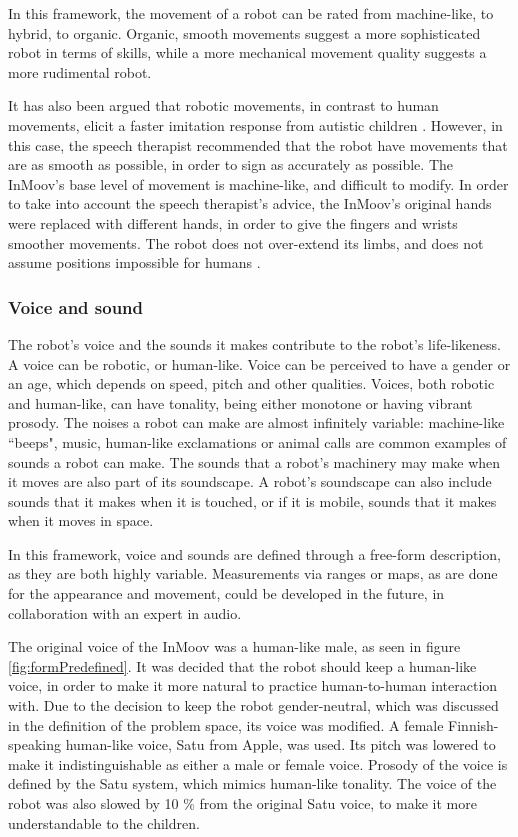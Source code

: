 In this framework, the movement of a robot can be rated from machine-like, to hybrid, to organic. Organic, smooth movements suggest a more sophisticated robot in terms of skills, while a more mechanical movement quality suggests a more rudimental robot.

It has also been argued that robotic movements, in contrast to human movements, elicit a faster imitation response from autistic children \cite{pierno2008robotic}. However, in this case, the speech therapist recommended that the robot have movements that are as smooth as possible, in order to sign as accurately as possible. The InMoov's base level of movement is machine-like, and difficult to modify. In order to take into account the speech therapist's advice, the InMoov's original hands were replaced with different hands, in order to give the fingers and wrists smoother movements. The robot does not over-extend its limbs, and does not assume positions impossible for humans \cite{giullian2010detailed}.


\subsubsection{Voice and sound}

The robot's voice and the sounds it makes contribute to the robot's life-likeness. A voice can be robotic, or human-like. Voice can be perceived to have a gender or an age, which depends on speed, pitch and other qualities. Voices, both robotic and human-like, can have tonality, being either monotone or having vibrant prosody. The noises a robot can make are almost infinitely variable: machine-like ``beeps", music, human-like exclamations or animal calls are common examples of sounds a robot can make. The sounds that a robot's machinery may make when it moves are also part of its soundscape. A robot's soundscape can also include sounds that it makes when it is touched, or if it is mobile, sounds that it makes when it moves in space.

In this framework, voice and sounds are defined through a free-form description, as they are both highly variable. Measurements via ranges or maps, as are done for the appearance and movement, could be developed in the future, in collaboration with an expert in audio.


The original voice of the InMoov was a human-like male, as seen in figure \ref{fig:formPredefined}. It was decided that the robot should keep a human-like voice, in order to make it more natural to practice human-to-human interaction with. Due to the decision to keep the robot gender-neutral, which was discussed in the definition of the problem space, its voice was modified. A female Finnish-speaking human-like voice, Satu from Apple, was used. Its pitch was lowered to make it indistinguishable as either a male or female voice. Prosody of the voice is defined by the Satu system, which mimics human-like tonality. The voice of the robot was also slowed by 10 \% from the original Satu voice, to make it more understandable to the children.

